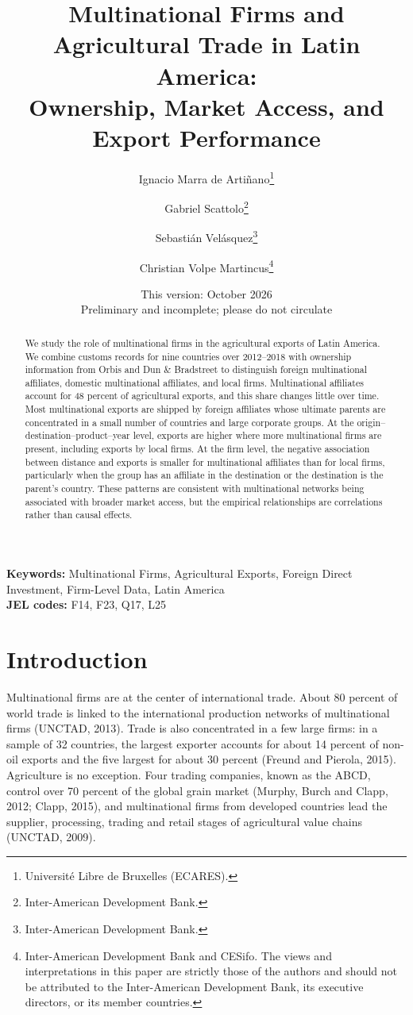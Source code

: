 \documentclass[11pt,a4paper]{article}
\title{Multinational Firms and Agricultural Trade in Latin America:\\[3pt]\large Ownership, Market Access, and Export Performance}
\author{Ignacio Marra de Arti\~nano\thanks{Universit\'e Libre de Bruxelles (ECARES).}
 \and Gabriel Scattolo\thanks{Inter-American Development Bank.}
 \and Sebasti\'an Vel\'asquez\thanks{Inter-American Development Bank.}
 \and Christian Volpe Martincus\thanks{Inter-American Development Bank and CESifo. The views and
interpretations in this paper are strictly those of the authors and should not be attributed to
the Inter-American Development Bank, its executive directors, or its member countries.}}
\date{This version: October 2026 \\[2pt] \small Preliminary and incomplete; please do not circulate}
\begin{document}
\maketitle
\thispagestyle{empty}
\begin{abstract}\noindent
We study the role of multinational firms in the agricultural exports of Latin America. We combine customs records for nine countries over 2012--2018 with ownership information from Orbis and Dun \& Bradstreet to distinguish foreign multinational affiliates, domestic multinational affiliates, and local firms. Multinational affiliates account for 48 percent of agricultural exports, and this share changes little over time. Most multinational exports are shipped by foreign affiliates whose ultimate parents are concentrated in a small number of countries and large corporate groups. At the origin--destination--product--year level, exports are higher where more multinational firms are present, including exports by local firms. At the firm level, the negative association between distance and exports is smaller for multinational affiliates than for local firms, particularly when the group has an affiliate in the destination or the destination is the parent's country. These patterns are consistent with multinational networks being associated with broader market access, but the empirical relationships are correlations rather than causal effects.
\end{abstract}
\vspace{4pt}
\noindent\textbf{Keywords:} Multinational Firms, Agricultural Exports, Foreign Direct Investment, Firm-Level Data, Latin America \\
\noindent\textbf{JEL codes:} F14, F23, Q17, L25
\clearpage

\section{Introduction}\label{sec:intro}
Multinational firms are at the center of international trade. About 80 percent of world trade is
linked to the international production networks of multinational firms (UNCTAD, 2013). Trade is
also concentrated in a few large firms: in a sample of 32 countries, the largest exporter accounts
for about 14 percent of non-oil exports and the five largest for about 30 percent (Freund and
Pierola, 2015). Agriculture is no exception. Four trading companies, known as the ABCD, control
over 70 percent of the global grain market (Murphy, Burch and Clapp, 2012; Clapp, 2015), and
multinational firms from developed countries lead the supplier, processing, trading and retail
stages of agricultural value chains (UNCTAD, 2009).
\end{document}
